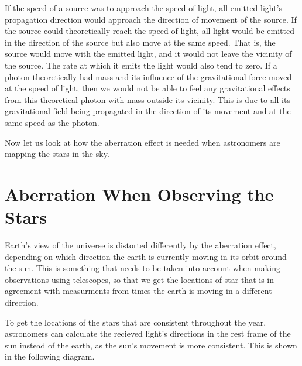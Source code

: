 
If the speed of a source was to approach the speed of light, all emitted light's propagation direction would approach the direction of movement of the source.
If the source could theoretically reach the speed of light, all light would be emitted in the direction of the source but also move at the same speed.
That is, the source would move with the emitted light, and it would not leave the vicinity of the source.
The rate at which it emits the light would also tend to zero.
If a photon theoretically had mass and its influence of the gravitational force moved at the speed of light, then we would not be able to feel any gravitational effects from this theoretical photon with mass outside its vicinity.
This is due to all its gravitational field being propagated in the direction of its movement and at the same speed as the photon.

Now let us look at how the aberration effect is needed when astronomers are mapping the stars in the sky.

\section{Aberration When Observing the Stars}\label{sect: Aberration When Observing the Stars}

Earth's view of the universe is distorted differently by the \hyperlink{def-aberration}{aberration} effect, depending on which direction the earth is currently moving in its orbit around the sun.
This is something that needs to be taken into account when making observations using telescopes, so that we get the locations of star that is in agreement with measurments from times the earth is moving in a different direction.

To get the locations of the stars that are consistent throughout the year, astronomers can calculate the recieved light's directions in the rest frame of the sun instead of the earth, as the sun's movement is more consistent.
This is shown in the following diagram.

